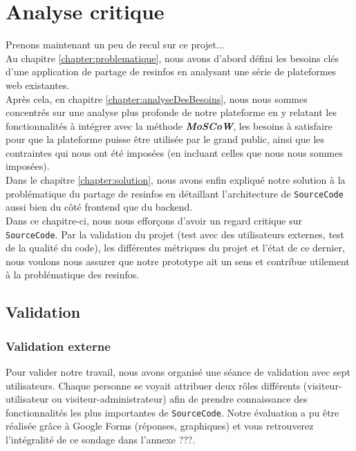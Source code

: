 \chapter{Analyse critique}

Prenons maintenant un peu de recul sur ce projet...\\

Au chapitre \ref{chapter:problematique}, nous avons d'abord défini les besoins clés d'une application de partage de \glspl{resinfo} en analysant une série de plateformes web existantes.\\

Après cela, en chapitre \ref{chapter:analyseDesBesoins}, nous nous sommes concentrés sur une analyse plus profonde de notre plateforme en y relatant les fonctionnalités à intégrer avec la méthode \textbf{\textit{MoSCoW}}, les besoins à satisfaire pour que la plateforme puisse être utilisée par le grand public, ainsi que les contraintes qui nous ont été imposées (en incluant celles que nous nous sommes imposées).\\

Dans le chapitre \ref{chapter:solution}, nous avons enfin expliqué notre solution à la problématique du partage de \glspl{resinfo} en détaillant l'architecture de \texttt{SourceCode} aussi bien du côté \gls{frontend} que du \gls{backend}.\\

Dans ce chapitre-ci, nous nous efforçons d'avoir un regard critique sur \texttt{SourceCode}. Par la validation du projet (test avec des utilisateurs externes, test de la qualité du code), les différentes métriques du projet et l'état de ce dernier, nous voulons nous assurer que notre prototype ait un sens et contribue utilement à la problématique des \glspl{resinfo}.

\section{Validation}
\label{section:validation}

\subsection{Validation externe}

Pour valider notre travail, nous avons organisé une séance de validation avec sept utilisateurs. Chaque personne se voyait attribuer deux rôles différents (visiteur-utilisateur ou visiteur-administrateur) afin de prendre connaissance des fonctionnalités les plus importantes de \texttt{SourceCode}. Notre évaluation a pu être réalisée grâce à Google Forms (réponses, graphiques) et vous retrouverez l'intégralité de ce sondage dans l'annexe ???.\\

